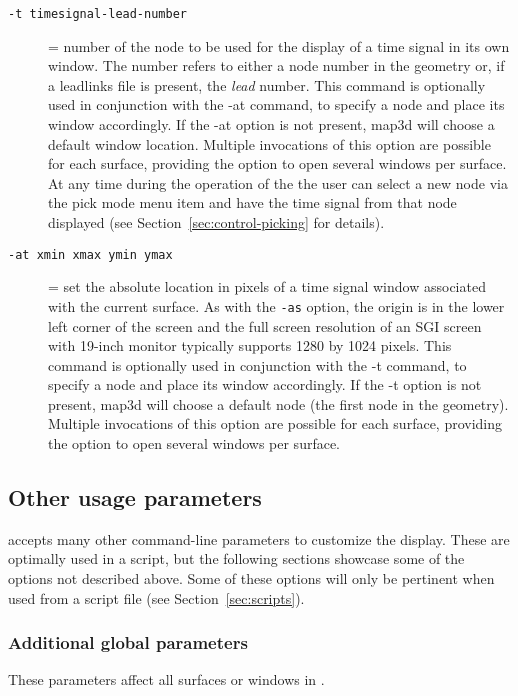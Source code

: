 \begin{description}
  \item[{\tt -t timesignal-lead-number}] = number of the node to be used
    for the display of a time signal in its own window.  The number refers
    to either a node number in the geometry or, if a leadlinks file is
    present, the \emph{lead} number.  This command is optionally used in
    conjunction with the -at command, to specify a node and place its
    window accordingly.  If the -at option is not present, map3d will
    choose a default window location.  Multiple invocations of this option
    are possible for each surface, providing the option to open several
    windows per surface.  At any time during the operation of the \map{}
    the user can select a new node via the pick mode menu item and have the
    time signal from that node displayed (see
    Section~\ref{sec:control-picking} for details).
    
  \item[{\tt-at xmin xmax ymin ymax}] = set the absolute location in pixels
    of a time signal window associated with the current surface.  As with
    the \texttt{-as} option, the origin is in the lower left corner of the
    screen and the full screen resolution of an SGI screen with 19-inch
    monitor typically supports 1280 by 1024 pixels.  This command is
    optionally used in conjunction with the -t command, to specify a node
    and place its window accordingly.  If the -t option is not present,
    map3d will choose a default node (the first node in the geometry).
    Multiple invocations of this option are possible for each surface,
    providing the option to open several windows per surface.
        
\end{description}

\subsection{Other usage parameters}
\map{} accepts many other command-line parameters to customize the display.
These are optimally used in a script, but the following sections showcase
some of the options not described above.  Some of these options will
only be pertinent when used from a script file (see Section~\ref{sec:scripts}).

\subsubsection{Additional global parameters}
These parameters affect all surfaces or windows in \map{}.

